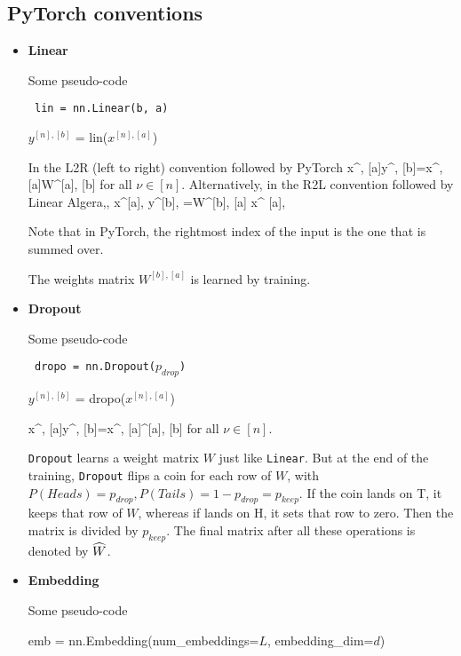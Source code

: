 \subsection{PyTorch conventions}



\begin{itemize}
\item {\bf Linear}

Some pseudo-code
\begin{mdframed}[hidealllines=true,backgroundcolor=blue!10]
{\tt
lin = nn.Linear(b, a)

$y^{[n], [b]}$ = lin($x^{[n],[a]}$)
}
\end{mdframed}
In the L2R (left to right) convention followed by PyTorch
\beq
x^{\nu, [a]}\rarrow y^{\nu, [b]}=x^{\nu, [a]}W^{[a], [b]}
\eeq
for all  $\nu\in[n]$. Alternatively, in
the R2L convention followed by Linear Algera,,
\beq
x^{[a], \nu}\rarrow y^{[b], \nu}=W^{[b], [a]}
x^{ [a], \nu}
\eeq
 
Note that in PyTorch, the rightmost index of the input is the 
one that is summed over.

The weights matrix $W^{[b], [a]}$ is learned by training.

\item {\bf Dropout}

Some pseudo-code
\begin{mdframed}[hidealllines=true,backgroundcolor=blue!10]
{\tt
dropo = nn.Dropout($p_{drop}$)

$y^{[n], [b]}$ = dropo($x^{[n],[a]}$)
}
\end{mdframed}


\beq
x^{\nu, [a]}\rarrow y^{\nu, [b]}=x^{\nu, [a]}^{[a], [b]}
\eeq
for all  $\nu\in[n]$.

{\tt Dropout} learns a weight matrix $W$ just like
{\tt Linear}. But at the end of the
training,
{\tt  Dropout} flips a coin
for each row of $W$, with $P(Heads)=p_{drop}, P(Tails)=1-p_{drop}=p_{keep}$. If the coin lands on T, it keeps that row of $W$, whereas if lands on H,
it sets that row to zero. Then the
matrix  is
divided by $p_{keep}$.
The final matrix after all these operations  is denoted by ${\widehat{W}}$.



\item {\bf Embedding}

Some pseudo-code
\begin{mdframed}[hidealllines=true,backgroundcolor=blue!10]
{\tt

emb = nn.Embedding(num\_embeddings=$L$, embedding\_dim=$d$)

}
\end{mdframed}
\end{itemize}
